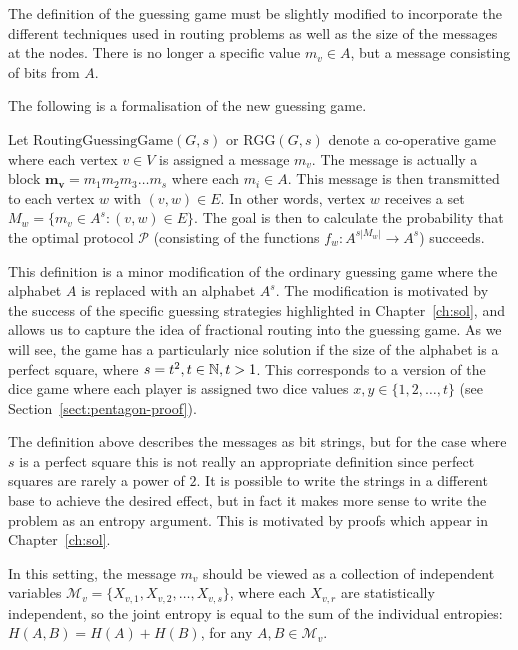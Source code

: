 The definition of the guessing game must be slightly modified to incorporate the different techniques used in routing problems as well as the size of the messages at the nodes. There is no longer a specific value $m_v \in A$, but a message consisting of bits from $A$.

The following is a formalisation of the new guessing game.

\begin{definition}

Let $\mathrm{RoutingGuessingGame}(G, s)$ or $\mathrm{RGG}(G, s)$ denote a co-operative game where each vertex $v \in V$ is assigned a message $m_v$. The message is actually a block $\mathbf{m_v} = m_1 m_2 m_3 \dots m_s$ where each $m_i \in A$. This message is then transmitted to each vertex $w$ with $(v, w) \in E$. In other words, vertex $w$ receives a set $M_w = \{m_v \in A^s : (v, w) \in E\}$. The goal is then to calculate the probability that the optimal protocol $\mathcal{P}$ (consisting of the functions $f_w : A^{s|M_w|} \rightarrow A^s$) succeeds.

\end{definition}

This definition is a minor modification of the ordinary guessing game where the alphabet $A$ is replaced with an alphabet $A^s$. The modification is motivated by the success of the specific guessing strategies highlighted in Chapter~\ref{ch:sol}, and allows us to capture the idea of fractional routing into the guessing game. As we will see, the game has a particularly nice solution if the size of the alphabet is a perfect square, where $s = t^2, t \in \mathbb{N}, t > 1$. This corresponds to a version of the dice game where each player is assigned two dice values $x, y \in \{1, 2, \dots, t\}$ (see Section~\ref{sect:pentagon-proof}).

The definition above describes the messages as bit strings, but for the case where $s$ is a perfect square this is not really an appropriate definition since perfect squares are rarely a power of $2$. It is possible to write the strings in a different base to achieve the desired effect, but in fact it makes more sense to write the problem as an entropy argument. This is motivated by proofs which appear in Chapter~\ref{ch:sol}.

In this setting, the message $m_v$ should be viewed as a collection of independent variables $\mathcal{M}_v = \{ X_{v, 1}, X_{v, 2}, \dots, X_{v, s} \}$, where each $X_{v, r}$ are statistically independent, so the joint entropy is equal to the sum of the individual entropies: $H(A, B) = H(A) + H(B)$, for any $A, B \in \mathcal{M}_v$.

